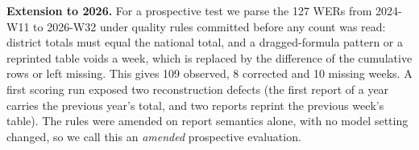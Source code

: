 \textbf{Extension to 2026.} For a prospective test we parse the 127 WERs from 2024-W11 to
2026-W32 under quality rules committed before any count was read: district totals must
equal the national total, and a dragged-formula pattern or a reprinted table voids a
week, which is replaced by the difference of the cumulative rows or left missing. This
gives 109 observed, 8 corrected and 10 missing weeks. A first scoring run exposed two
reconstruction defects (the first report of a year carries the previous year's total,
and two reports reprint the previous week's table). The rules were amended on report
semantics alone, with no model setting changed, so we call this an \emph{amended}
prospective evaluation.
